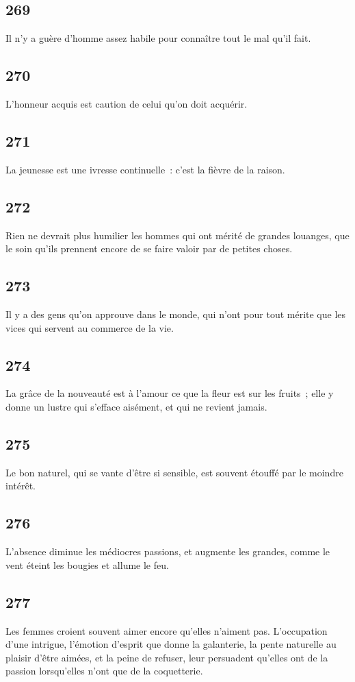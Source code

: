 \documentclass[french,twoside]{book} %
\begin{document}
\subsection[{269}]{ \textsc{269} }
\noindent Il n’y a guère d’homme assez habile pour connaître tout le mal qu’il fait.
\subsection[{270}]{ \textsc{270} }
\noindent L’honneur acquis est caution de celui qu’on doit acquérir.
\subsection[{271}]{ \textsc{271} }
\noindent La jeunesse est une ivresse continuelle : c’est la fièvre de la raison.
\subsection[{272}]{ \textsc{272} }
\noindent Rien ne devrait plus humilier les hommes qui ont mérité de grandes louanges, que le soin qu’ils prennent encore de se faire valoir par de petites choses.
\subsection[{273}]{ \textsc{273} }
\noindent Il y a des gens qu’on approuve dans le monde, qui n’ont pour tout mérite que les vices qui servent au commerce de la vie.
\subsection[{274}]{ \textsc{274} }
\noindent La grâce de la nouveauté est à l’amour ce que la fleur est sur les fruits ; elle y donne un lustre qui s’efface aisément, et qui ne revient jamais.
\subsection[{275}]{ \textsc{275} }
\noindent Le bon naturel, qui se vante d’être si sensible, est souvent étouffé par le moindre intérêt.
\subsection[{276}]{ \textsc{276} }
\noindent L’absence diminue les médiocres passions, et augmente les grandes, comme le vent éteint les bougies et allume le feu.
\subsection[{277}]{ \textsc{277} }
\noindent Les femmes croient souvent aimer encore qu’elles n’aiment pas. L’occupation d’une intrigue, l’émotion d’esprit que donne la galanterie, la pente naturelle au plaisir d’être aimées, et la peine de refuser, leur persuadent qu’elles ont de la passion lorsqu’elles n’ont que de la coquetterie.
\end{document}
